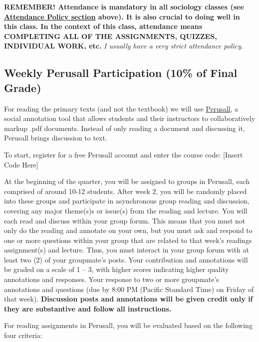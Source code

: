 \documentclass[11pt,]{article}
\begin{document}
\textbf{REMEMBER! Attendance is mandatory in all sociology classes (see
\protect\hyperlink{attendance}{Attendance Policy section} above). It is
also crucial to doing well in this class. In the context of this class,
attendance means COMPLETING ALL OF THE ASSIGNMENTS, QUIZZES, INDIVIDUAL
WORK, etc.} \emph{I usually have a very strict attendance policy.}

\hypertarget{weekly-perusall-participation-10-of-final-grade}{%
\subsection{Weekly Perusall Participation (10\% of Final
Grade)}\label{weekly-perusall-participation-10-of-final-grade}}

For reading the primary texts (and not the textbook) we will use
\href{https://support.perusall.com/hc/en-us}{Perusall}, a social
annotation tool that allows students and their instructors to
collaboratively markup .pdf documents. Instead of only reading a
document and discussing it, Perusall brings discussion to text.

To start, register for a free Perusall account and enter the course
code: {[}Insert Code Here{]}

At the beginning of the quarter, you will be assigned to groups in
Perusall, each comprised of around 10-12 students. After week 2, you
will be randomly placed into these groups and participate in
asynchronous group reading and discussion, covering any major theme(s)s
or issue(s) from the reading and lecture. You will each read and discuss
within your group forum. This means that you must not only do the
reading and annotate on your own, but you must ask and respond to one or
more questions within your group that are related to that week's
readings assignment(s) and lecture. Thus, you must interact in your
group forum with at least two (2) of your groupmate's posts. Your
contribution and annotations will be graded on a scale of 1 -- 3, with
higher scores indicating higher quality annotations and responses. Your
response to two or more groupmate's annotations and questions (due by
8:00 PM (Pacific Standard Time) on Friday of that week).
\textbf{Discussion posts and annotations will be given credit only if
they are substantive and follow all instructions.}

For reading assignments in Perusall, you will be evaluated based on the
following four criteria:
\end{document}
